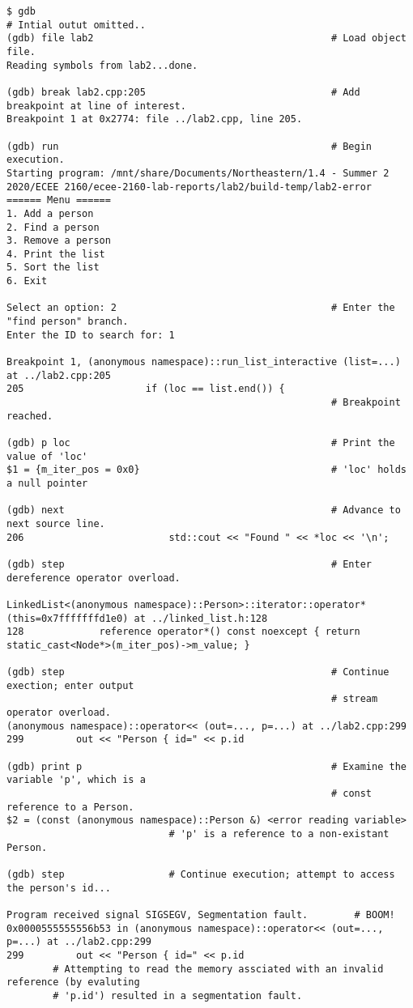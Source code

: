 \documentclass[11pt, letterpaper]{article} %
\begin{document}
\begin{lstlisting}[style=labreportstyle-sh]
$ gdb
# Intial outut omitted..
(gdb) file lab2                                         # Load object file.
Reading symbols from lab2...done.

(gdb) break lab2.cpp:205                                # Add breakpoint at line of interest.
Breakpoint 1 at 0x2774: file ../lab2.cpp, line 205.

(gdb) run                                               # Begin execution.
Starting program: /mnt/share/Documents/Northeastern/1.4 - Summer 2 2020/ECEE 2160/ecee-2160-lab-reports/lab2/build-temp/lab2-error 
====== Menu ======
1. Add a person
2. Find a person
3. Remove a person
4. Print the list
5. Sort the list
6. Exit

Select an option: 2                                     # Enter the "find person" branch.
Enter the ID to search for: 1

Breakpoint 1, (anonymous namespace)::run_list_interactive (list=...) at ../lab2.cpp:205
205                     if (loc == list.end()) {
                                                        # Breakpoint reached.
        
(gdb) p loc                                             # Print the value of 'loc'
$1 = {m_iter_pos = 0x0}                                 # 'loc' holds a null pointer

(gdb) next                                              # Advance to next source line.
206                         std::cout << "Found " << *loc << '\n';

(gdb) step                                              # Enter dereference operator overload.

LinkedList<(anonymous namespace)::Person>::iterator::operator* (this=0x7fffffffd1e0) at ../linked_list.h:128
128             reference operator*() const noexcept { return static_cast<Node*>(m_iter_pos)->m_value; }

(gdb) step                                              # Continue exection; enter output
                                                        # stream operator overload.
(anonymous namespace)::operator<< (out=..., p=...) at ../lab2.cpp:299
299         out << "Person { id=" << p.id

(gdb) print p                                           # Examine the variable 'p', which is a
                                                        # const reference to a Person.
$2 = (const (anonymous namespace)::Person &) <error reading variable>
                            # 'p' is a reference to a non-existant Person.

(gdb) step                  # Continue execution; attempt to access the person's id...

Program received signal SIGSEGV, Segmentation fault.        # BOOM!
0x0000555555556b53 in (anonymous namespace)::operator<< (out=..., p=...) at ../lab2.cpp:299
299         out << "Person { id=" << p.id
        # Attempting to read the memory assciated with an invalid reference (by evaluting
        # 'p.id') resulted in a segmentation fault.
\end{lstlisting}
\end{document}
